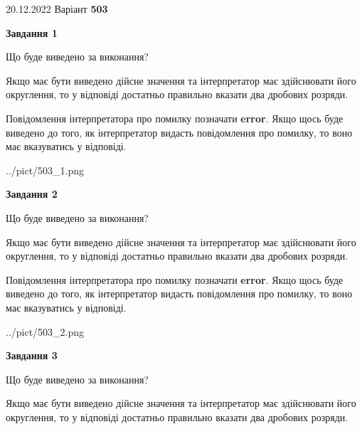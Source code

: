 \documentclass[12pt, ukrainian]{article}
\begin{document}
{20.12.2022 Варіант \No \textbf { 503 }\par}
{
\begin {Large}

{\begin {center}\textbf{Завдання 1}\end {center}}\par
Що буде виведено за виконання? \par

Якщо має бути виведено дійсне значення та інтерпретатор має здійснювати його округлення, 
то у відповіді достатньо правильно вказати два дробових розряди.

Повідомлення інтерпретатора про помилку позначати \textbf{error}.
Якщо щось буде виведено до того, як інтерпретатор видасть повідомлення про помилку, 
то воно має вказуватись у відповіді. \par

\begin{center}
	{../pict/503_1.png}
\end{center}
\newpage

{\begin {center}\textbf{Завдання 2}\end {center}}\par
Що буде виведено за виконання? \par

Якщо має бути виведено дійсне значення та інтерпретатор має здійснювати його округлення, 
то у відповіді достатньо правильно вказати два дробових розряди.

Повідомлення інтерпретатора про помилку позначати \textbf{error}.
Якщо щось буде виведено до того, як інтерпретатор видасть повідомлення про помилку, 
то воно має вказуватись у відповіді. \par

\begin{center}
	{../pict/503_2.png}
\end{center}
\newpage

{\begin {center}\textbf{Завдання 3}\end {center}}\par
Що буде виведено за виконання? \par

Якщо має бути виведено дійсне значення та інтерпретатор має здійснювати його округлення, 
то у відповіді достатньо правильно вказати два дробових розряди.


\end{Large}}
\end{document}
